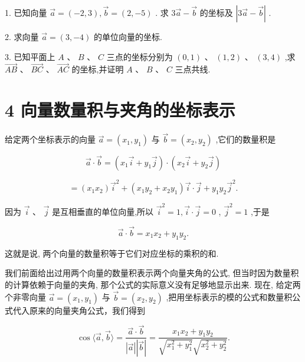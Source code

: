 \documentclass[10pt]{article}
\begin{document}
1. 已知向量 \(\overrightarrow{a} = \left( {-2,3}\right) ,\overrightarrow{b} = \left( {2, - 5}\right)\) . 求 \(3\overrightarrow{a} - \overrightarrow{b}\) 的坐标及 \(\left| {3\overrightarrow{a} - \overrightarrow{b}}\right|\) .

2. 求向量 \(\overrightarrow{a} = \left( {3, - 4}\right)\) 的单位向量的坐标.

3. 已知平面上 \(A\text{ 、 }B\text{ 、 }C\) 三点的坐标分别为 \(\left( {0,1}\right) \text{ 、 }\left( {1,2}\right) \text{ 、 }\left( {3,4}\right)\) ,求 \(\overrightarrow{AB}\text{ 、 }\overrightarrow{BC}\text{ 、 }\overrightarrow{AC}\) 的坐标,并证明 \(A\text{ 、 }B\text{ 、 }C\) 三点共线.

\section*{4 向量数量积与夹角的坐标表示}

给定两个坐标表示的向量 \(\overrightarrow{a} = \left( {{x}_{1},{y}_{1}}\right)\) 与 \(\overrightarrow{b} = \left( {{x}_{2},{y}_{2}}\right)\) ,它们的数量积是

\[
\overrightarrow{a} \cdot  \overrightarrow{b} = \left( {{x}_{1}\overrightarrow{i} + {y}_{1}\overrightarrow{j}}\right)  \cdot  \left( {{x}_{2}\overrightarrow{i} + {y}_{2}\overrightarrow{j}}\right)
\]

\[
= \left( {{x}_{1}{x}_{2}}\right) {\overrightarrow{i}}^{2} + \left( {{x}_{1}{y}_{2} + {x}_{2}{y}_{1}}\right) \overrightarrow{i} \cdot  \overrightarrow{j} + {y}_{1}{y}_{2}{\overrightarrow{j}}^{2}.
\]

因为 \(\overrightarrow{i}\text{ 、 }\overrightarrow{j}\) 是互相垂直的单位向量,所以 \({\overrightarrow{i}}^{2} = 1,\overrightarrow{i} \cdot  \overrightarrow{j} = 0\) , \({\overrightarrow{j}}^{2} = 1\) ,于是

\[
\overrightarrow{a} \cdot  \overrightarrow{b} = {x}_{1}{x}_{2} + {y}_{1}{y}_{2}.
\]

这就是说, 两个向量的数量积等于它们对应坐标的乘积的和.

我们前面给出过用两个向量的数量积表示两个向量夹角的公式, 但当时因为数量积的计算依赖于向量的夹角, 那个公式的实际意义没有足够地显示出来. 现在, 给定两个非零向量 \(\overrightarrow{a} = \left( {{x}_{1},{y}_{1}}\right)\) 与 \(\overrightarrow{b} = \left( {{x}_{2},{y}_{2}}\right)\) ,把用坐标表示的模的公式和数量积公式代入原来的向量夹角公式，我们得到

\[
\cos \langle \overrightarrow{a},\overrightarrow{b}\rangle  = \frac{\overrightarrow{a} \cdot  \overrightarrow{b}}{\left| \overrightarrow{a}\right| \left| \overrightarrow{b}\right| } = \frac{{x}_{1}{x}_{2} + {y}_{1}{y}_{2}}{\sqrt{{x}_{1}^{2} + {y}_{1}^{2}}\sqrt{{x}_{2}^{2} + {y}_{2}^{2}}}.
\]
\end{document}
